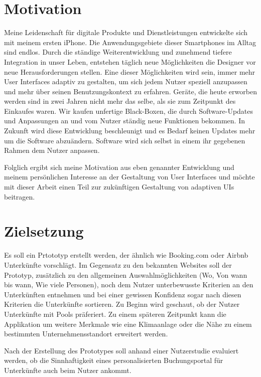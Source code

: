 \section{Motivation}
Meine Leidenschaft für digitale Produkte und Dienstleistungen entwickelte sich mit meinem ersten iPhone.
Die Anwendungsgebiete dieser Smartphones im Alltag sind endlos. Durch die ständige Weiterentwicklung
und zunehmend tiefere Integration in unser Leben, entstehen täglich neue Möglichkeiten die Designer vor
neue Herausforderungen stellen. Eine dieser Möglichkeiten wird sein, immer mehr User Interfaces adaptiv zu gestalten,
um sich jedem Nutzer speziell anzupassen und mehr über seinen Benutzungskontext zu erfahren. Geräte, die
heute erworben werden sind in zwei Jahren nicht mehr das selbe, als sie zum Zeitpunkt des Einkaufes waren.
Wir kaufen unfertige Black-Boxen,
die durch Software-Updates und Anpassungen an und vom Nutzer ständig neue Funktionen bekommen. %
In Zukunft wird diese Entwicklung beschleunigt und es Bedarf keinen Updates mehr um die Software abzuändern.
Software wird sich selbst in einem ihr gegebenen Rahmen dem Nutzer anpassen.

Folglich ergibt sich meine Motivation aus eben genannter Entwicklung und meinem persönlichen Interesse an der Gestaltung von User
Interfaces und möchte mit dieser Arbeit einen Teil zur zukünftigen Gestaltung von adaptiven UIs beitragen.

\section{Zielsetzung}
\label{Zielsetzung}
Es soll ein Prtototyp erstellt werden, der ähnlich wie Booking.com oder Airbnb Unterkünfte vorschlägt.
Im Gegensatz zu den bekannten Websites soll der Prototyp, zusätzlich zu den allgemeinen Auswahlmöglichkeiten (Wo, Von wann bis wann, Wie viele Personen),
noch dem Nutzer unterbewusste Kriterien an den Unterkünften entnehmen und bei einer gewissen Konfidenz sogar nach diesen
Kriterien die Unterkünfte sortieren. Zu Beginn wird geschaut, ob der Nutzer Unterkünfte mit Pools präferiert. Zu einem späteren
Zeitpunkt kann die Applikation um weitere Merkmale wie eine Klimaanlage oder die Nähe zu einem bestimmten Unternehmensstandort erweitert werden.

Nach der Erstellung des Prototypes soll anhand einer Nutzerstudie evaluiert werden, ob die Sinnhaftigkeit eines personalisierten
Buchungsportal für Unterkünfte auch beim Nutzer ankommt.

